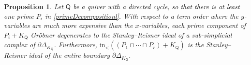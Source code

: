 \documentclass[10pt]{amsart}
\numberwithin{equation}{section}
\newtheorem{prop}[thm]{Proposition}
\theoremstyle{definition}
\theoremstyle{remark}
\newcommand{\1}{^{-1}}
\def\Q{\mathsf{Q}}
\begin{document}
\begin{prop}\label{prop:boundarySphere}
Let $\Q$ be a quiver with a directed cycle, so that there is at least one prime $P_i$ in \eqref{primeDecompositionl}.
With respect to a term order where the $y$-variables are much more expensive than the $x$-variables, each prime component of $P_i+K_\Q$ Gr\"obner degenerates to the Stanley--Reisner ideal of a sub-simplicial complex of $\partial \Delta_{K_\Q}$. 
Furthermore,
$\textrm{in}_< ((P_1\cap\cdots \cap P_r) + K_\Q)$ is the Stanley--Reisner ideal of the entire boundary $\partial \Delta_{K_\Q}$.
\end{prop}
\end{document}
